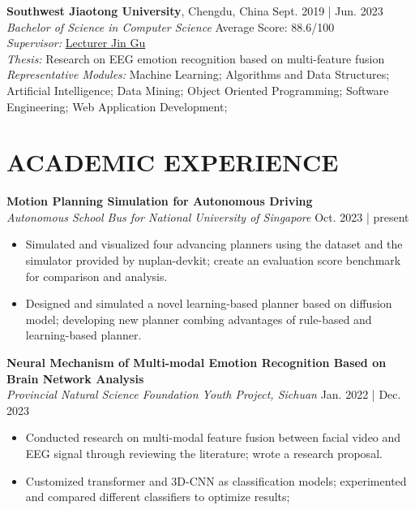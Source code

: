 \documentclass[a4paper,9pt]{extarticle}
\begin{document}
\noindent
\textbf{Southwest Jiaotong University}, Chengdu, China \hfill Sept. 2019 | Jun. 2023 \\ %
\textit{Bachelor of Science in Computer Science}  \hfill Average Score: 88.6/100 \\ %
\textit{Supervisor:} \href{https://faculty.swjtu.edu.cn/gujin/zh_CN/index.htm}{Lecturer Jin Gu} \\
\textit{Thesis:} Research on EEG emotion recognition based on multi-feature fusion \\%
\textit{Representative Modules:} Machine Learning; Algorithms and Data Structures; Artificial Intelligence; Data Mining; Object Oriented Programming; Software Engineering; Web Application Development; 

\nocite{*}



\section*{ACADEMIC EXPERIENCE}

\noindent
\textbf{Motion Planning Simulation for Autonomous Driving} \\ %
\textit{Autonomous School Bus for National University of Singapore} \hfill Oct. 2023 | present %

\begin{itemize}
    \item Simulated and visualized four advancing planners using the dataset and the simulator provided by nuplan-devkit; create an evaluation score benchmark for comparison and analysis.
    \item Designed and simulated a novel learning-based planner based on diffusion model; developing new planner combing advantages of rule-based and learning-based planner.
\end{itemize}

\noindent
\textbf{Neural Mechanism of Multi-modal Emotion Recognition Based on Brain Network Analysis} \\ %
\textit{Provincial Natural Science Foundation Youth Project, Sichuan} \hfill Jan. 2022 | Dec. 2023
\begin{itemize}
    \item Conducted research on multi-modal feature fusion between facial video and EEG signal through reviewing the literature; wrote a research proposal.
    \item Customized transformer and 3D-CNN as classification models; experimented and compared different classifiers to optimize results; 
\end{itemize}
\end{document}
